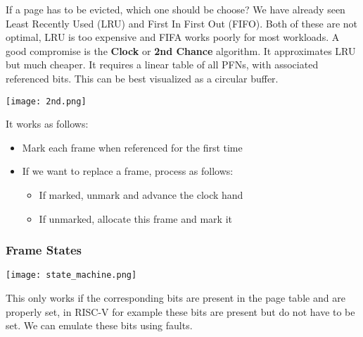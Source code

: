 If a page has to be evicted, which one should be choose? We have already seen Least Recently Used (LRU) and First In First Out (FIFO). Both of these are not optimal, LRU is too expensive and FIFA works poorly for most workloads. A good compromise is the \textbf{Clock} or \textbf{2nd Chance} algorithm. It approximates LRU but much cheaper. It requires a linear table of all PFNs, with associated referenced bits. This can be best visualized as a circular buffer.
\begin{center}
	\texttt{[image: 2nd.png]}
\end{center}

It works as follows:
\begin{itemize}
	\item Mark each frame when referenced for the first time
	\item If we want to replace a frame, process as follows: 
		\begin{itemize}
			\item If marked, unmark and advance the clock hand
			\item If unmarked, allocate this frame and mark it
		\end{itemize}
\end{itemize}

\subsubsection{Frame States}

\begin{center}
	\texttt{[image: state\_machine.png]}
\end{center}

This only works if the corresponding bits are present in the page table and are properly set, in RISC-V for example these bits are present but do not have to be set. We can emulate these bits using faults.
